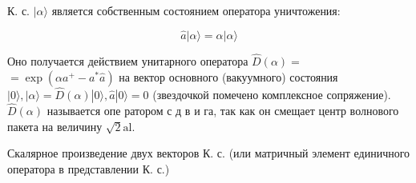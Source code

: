 \documentclass[10pt]{article}
\begin{document}
К. с. $|\alpha\rangle$ является собственным состоянием оператора уничтожения:



\[

\hat{a}|\alpha\rangle=\alpha|\alpha\rangle

\]



Оно получается действием унитарного оператора $\hat{D}(\alpha)=$ $=\exp \left(\alpha a^{+}-a^{*} \hat{a}\right)$ на вектор основного (вакуумного) состояния $|0\rangle,|\alpha\rangle=\hat{D}(\alpha)|0\rangle, \hat{a}|0\rangle=0$ (звездочкой помечено комплексное сопряжение). $\hat{D}(\alpha)$ называется опе ратором с д в и га, так как он смещает центр волнового пакета на величину $\sqrt{2} \mathrm{al}$.



Скалярное произведение двух векторов К. с. (или матричный элемент единичного оператора в представлении К. с.)
\end{document}
